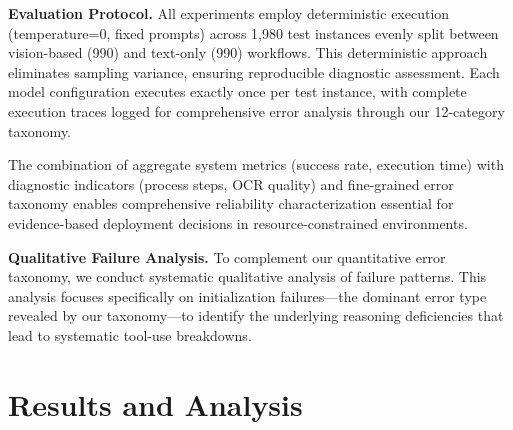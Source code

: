 \documentclass[conference]{IEEEtran}
\begin{document}
\textbf{Evaluation Protocol.} All experiments employ deterministic execution (temperature=0, fixed prompts) across 1,980 test instances evenly split between vision-based (990) and text-only (990) workflows. This deterministic approach eliminates sampling variance, ensuring reproducible diagnostic assessment. Each model configuration executes exactly once per test instance, with complete execution traces logged for comprehensive error analysis through our 12-category taxonomy.


The combination of aggregate system metrics (success rate, execution time) with diagnostic indicators (process steps, OCR quality) and fine-grained error taxonomy enables comprehensive reliability characterization essential for evidence-based deployment decisions in resource-constrained environments.

\textbf{Qualitative Failure Analysis.}
To complement our quantitative error taxonomy, we conduct systematic qualitative analysis of failure patterns. This analysis focuses specifically on initialization failures—the dominant error type revealed by our taxonomy—to identify the underlying reasoning deficiencies that lead to systematic tool-use breakdowns.



\section{Results and Analysis}
\label{sec:Results}

\end{document}
